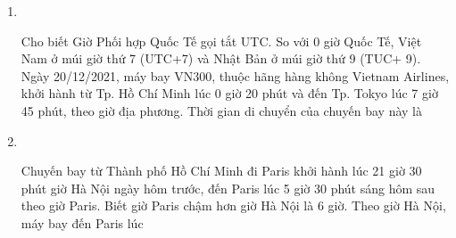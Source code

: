 \begin{enumerate}[label=\bfseries Câu \arabic*:,leftmargin=1.5cm]
\item {}\\
{Cho biết Giờ Phối hợp Quốc Tế gọi tắt UTC. So với 0 giờ Quốc Tế, Việt Nam ở múi giờ thứ 7 (UTC+7) và Nhật Bản ở múi giờ thứ 9 (TUC+ 9). Ngày 20/12/2021, máy bay VN300, thuộc hãng hàng không Vietnam Airlines, khởi hành từ Tp. Hồ Chí Minh lúc 0 giờ 20 phút và đến Tp. Tokyo lúc 7 giờ 45 phút, theo giờ địa phương. Thời gian di chuyển của chuyến bay này là
}
\item {}\\
{Chuyến bay từ Thành phố Hồ Chí Minh đi Paris khởi hành lúc 21 giờ 30 phút giờ Hà Nội ngày hôm trước, đến Paris lúc 5 giờ 30 phút sáng hôm sau theo giờ Paris. Biết giờ Paris chậm hơn giờ Hà Nội là 6 giờ. Theo giờ Hà Nội, máy bay đến Paris lúc
}

\end{enumerate}
